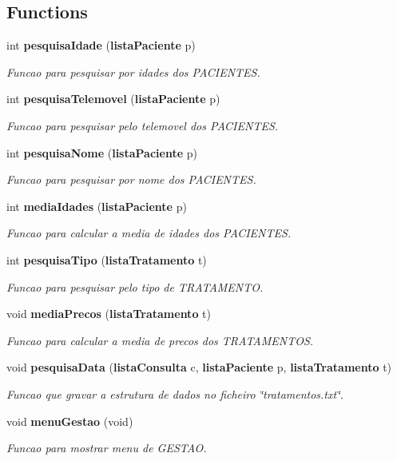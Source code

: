 \subsection*{Functions}
\begin{DoxyCompactItemize}
\item 
int {\bf pesquisa\+Idade} ({\bf lista\+Paciente} p)
\begin{DoxyCompactList}\small\item\em Funcao para pesquisar por idades dos P\+A\+C\+I\+E\+N\+T\+E\+S. \end{DoxyCompactList}\item 
int {\bf pesquisa\+Telemovel} ({\bf lista\+Paciente} p)
\begin{DoxyCompactList}\small\item\em Funcao para pesquisar pelo telemovel dos P\+A\+C\+I\+E\+N\+T\+E\+S. \end{DoxyCompactList}\item 
int {\bf pesquisa\+Nome} ({\bf lista\+Paciente} p)
\begin{DoxyCompactList}\small\item\em Funcao para pesquisar por nome dos P\+A\+C\+I\+E\+N\+T\+E\+S. \end{DoxyCompactList}\item 
int {\bf media\+Idades} ({\bf lista\+Paciente} p)
\begin{DoxyCompactList}\small\item\em Funcao para calcular a media de idades dos P\+A\+C\+I\+E\+N\+T\+E\+S. \end{DoxyCompactList}\item 
int {\bf pesquisa\+Tipo} ({\bf lista\+Tratamento} t)
\begin{DoxyCompactList}\small\item\em Funcao para pesquisar pelo tipo de T\+R\+A\+T\+A\+M\+E\+N\+T\+O. \end{DoxyCompactList}\item 
void {\bf media\+Precos} ({\bf lista\+Tratamento} t)
\begin{DoxyCompactList}\small\item\em Funcao para calcular a media de precos dos T\+R\+A\+T\+A\+M\+E\+N\+T\+O\+S. \end{DoxyCompactList}\item 
void {\bf pesquisa\+Data} ({\bf lista\+Consulta} c, {\bf lista\+Paciente} p, {\bf lista\+Tratamento} t)
\begin{DoxyCompactList}\small\item\em Funcao que gravar a estrutura de dados no ficheiro \char`\"{}tratamentos.\+txt\char`\"{}. \end{DoxyCompactList}\item 
void {\bf menu\+Gestao} (void)
\begin{DoxyCompactList}\small\item\em Funcao para mostrar menu de G\+E\+S\+T\+A\+O. \end{DoxyCompactList}\end{DoxyCompactItemize}


